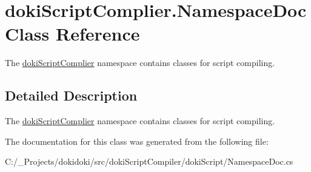 \hypertarget{classdoki_script_complier_1_1_namespace_doc}{}\section{doki\+Script\+Complier.\+Namespace\+Doc Class Reference}
\label{classdoki_script_complier_1_1_namespace_doc}


The \hyperlink{namespacedoki_script_complier}{doki\+Script\+Complier} namespace contains classes for script compiling.  




\subsection{Detailed Description}
The \hyperlink{namespacedoki_script_complier}{doki\+Script\+Complier} namespace contains classes for script compiling. 



The documentation for this class was generated from the following file\+:\begin{DoxyCompactItemize}
\item 
C\+:/\+\_\+\+Projects/dokidoki/src/doki\+Script\+Compiler/doki\+Script/Namespace\+Doc.\+cs\end{DoxyCompactItemize}

